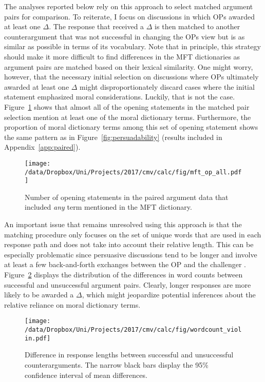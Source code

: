 The analyses reported below rely on this approach to select matched argument pairs for comparison. To reiterate, I focus on discussions in which OPs awarded at least one $\Delta$. The response that received a $\Delta$ is then matched to another counterargument that was not successful in changing  the OPs view but is as similar as possible in terms of its vocabulary. Note that in principle, this strategy should make it more difficult to find differences in the MFT dictionaries as argument pairs are matched based on their lexical similarity. One might worry, however, that the necessary initial selection on discussions where OPs ultimately awarded at least one $\Delta$ might disproportionately discard cases where the initial statement emphasized moral considerations. Luckily, that is not the case. Figure~\ref{fig:mft_op_all} shows that almost all of the opening statements in the matched pair selection mention at least one of the moral dictionary terms. Furthermore, the proportion of moral dictionary terms among this set of opening statement shows the same pattern as in Figure~\ref{fig:persuadability} (results included in Appendix~\ref{app:paired}).

\begin{figure}[ht]
\centering
\texttt{[image: /data/Dropbox/Uni/Projects/2017/cmv/calc/fig/mft\_op\_all.pdf]}
\caption[Number of opening statements in the paired argument data that included \textit{any} term mentioned in the MFT dictionary]{Number of opening statements in the paired argument data that included \textit{any} term mentioned in the MFT dictionary.}\label{fig:mft_op_all}
\end{figure}

An important issue that remains unresolved using this approach is that the matching procedure only focuses on the set of unique words that are used in each response path and does not take into account their relative length. This can be especially problematic since persuasive discussions tend to be longer and involve at least a few back-and-forth exchanges between the OP and the challenger \citep[c.f.,][616]{tan2016winning}. Figure~\ref{fig:wordcount_violin} displays the distribution of the differences in word counts between successful and unsuccessful argument pairs. Clearly, longer responses are more likely to be awarded a $\Delta$, which might jeopardize potential inferences about the relative reliance on moral dictionary terms.

\begin{figure}[ht]
\centering
\texttt{[image: /data/Dropbox/Uni/Projects/2017/cmv/calc/fig/wordcount\_violin.pdf]}
\caption[Difference in response lengths between successful and unsuccessful counterarguments]{Difference in response lengths between successful and unsuccessful counterarguments. The narrow black bars display the 95\% confidence interval of mean differences.}\label{fig:wordcount_violin}
\end{figure}

